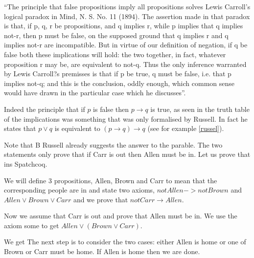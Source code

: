 {\quote  ``The principle that false propositions imply all propositions solves Lewis Carroll's logical paradox in Mind, N. S. No. 11 (1894). The assertion made in that paradox is that, if p, q, r be propositions, and q implies r, while p implies that q implies not-r, then p must be false, on the supposed ground that q implies r and q implies not-r are incompatible. But in virtue of our definition of negation, if q be false both these implications will hold: the two together, in fact, whatever proposition r may be, are equivalent to not-q. Thus the only inference warranted by Lewis Carroll?s premisses is that if p be true, q must be false, i.e. that p implies not-q; and this is the conclusion, oddly enough, which common sense would have drawn in the particular case which he discusses''.}

Indeed the principle that if $p$ is false then $p\rightarrow q$ is true, as seen in the truth table of the implications  was something that was only formalised by Russell. In fact he states that $p\lor q$ is equivalent to $(p \rightarrow q) \rightarrow q$ (see for example \ref{russel}).

Note that B Russell already suggests the answer to the parable. The two statements only prove that if Carr is out then Allen must be in. Let us prove that ins Spatchcoq.

We will define 3 propositions, Allen, Brown and Carr to mean that the corresponding people are in  and state two axioms, $not Allen->not Brown$ and $Allen \lor Brown \lor Carr$ and we prove that $ not Carr \rightarrow Allen$.


Now we assume that Carr is out and prove that Allen must be in. We use the axiom some to get $Allen \lor (Brown \lor Carr)$.



We get
The next step is to consider the two  cases: either Allen is home or one of Brown or Carr must be home. If Allen is home then we are done. 


